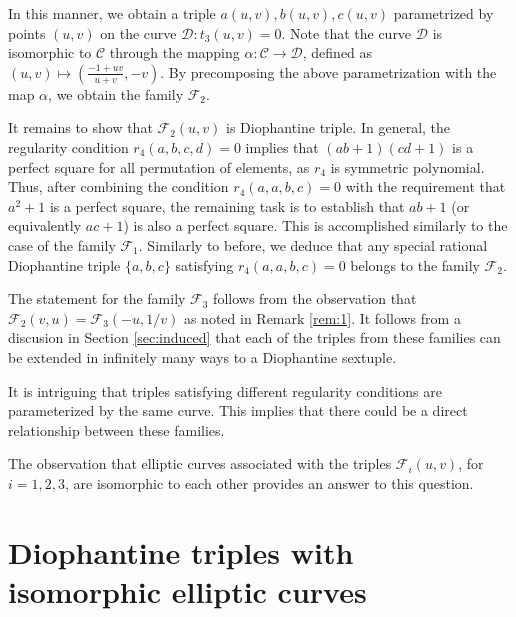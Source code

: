 \documentclass[a4paper]{amsart}
\theoremstyle{plain}
\theoremstyle{definition}
\begin{document}
In this manner, we obtain a triple ${a(u,v), b(u,v), c(u,v)}$ parametrized by points $(u,v)$ on the curve $\mathcal{D}:t_3(u,v)=0$. Note that the curve $\mathcal{D}$ is isomorphic to $\mathcal{C}$ through the mapping $\alpha: \mathcal{C} \rightarrow \mathcal{D}$, defined as $(u,v) \mapsto \left(\frac{-1+uv}{u+v}, -v\right)$. By precomposing the above parametrization with the map $\alpha$, we obtain the family $\mathcal{F}_2$.

It remains to show that $\mathcal{F}_2(u,v)$ is Diophantine triple. In general, the regularity condition $r_4(a,b,c,d)=0$ implies that $(ab+1)(cd+1)$ is a perfect square for all permutation of elements, as $r_4$ is symmetric polynomial. Thus, after combining the condition $r_4(a,a,b,c)=0$ with the requirement that $a^2+1$ is a perfect square, the remaining task is to establish that $ab+1$ (or equivalently $ac+1$) is also a perfect square. This is accomplished similarly to the case of the family $\mathcal{F}_1$. Similarly to before, we deduce that any special rational Diophantine triple $\{a,b,c\}$ satisfying $r_4(a,a,b,c)=0$ belongs to the family $\mathcal{F}_2$.

The statement for the family $\mathcal{F}_3$ follows from the observation that $\mathcal{F}_2(v,u)=\mathcal{F}_3(-u,1/v)$ as noted in Remark \ref{rem:1}. It follows from a discusion in Section \ref{sec:induced} that each of the triples from these families can be extended in infinitely many ways to a Diophantine sextuple.

It is intriguing that triples satisfying different regularity conditions are parameterized by the same curve. This implies that there could be a direct relationship between these families.


The observation that elliptic curves associated with the triples $\mathcal{F}_i(u,v)$, for $i=1,2,3$, are isomorphic to each other provides an answer to this question.

\section{Diophantine triples with isomorphic elliptic curves}
\end{document}
